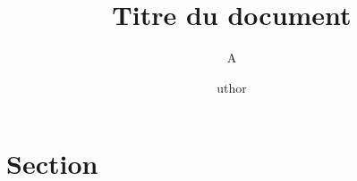 \documentclass{article}
\begin{document}
	\author{\subtitle Author}
	\title{\Huge \bigtitle Titre du document \vspace{-0,4em}}
	\date{}
	\maketitle

\section{\sec Section}
\end{document}
